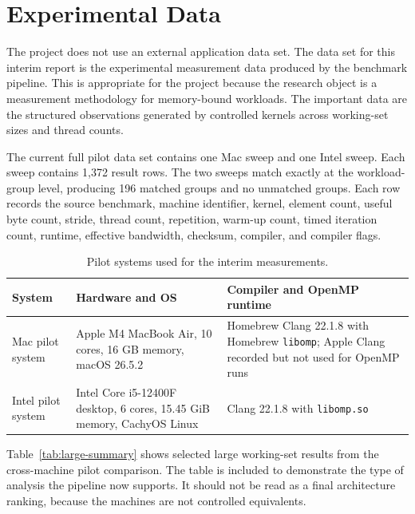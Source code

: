 \documentclass[11pt]{article}
\begin{document}
\section{Experimental Data}

The project does not use an external application data set. The data set for this interim report is the experimental measurement data produced by the benchmark pipeline. This is appropriate for the project because the research object is a measurement methodology for memory-bound workloads. The important data are the structured observations generated by controlled kernels across working-set sizes and thread counts.

The current full pilot data set contains one Mac sweep and one Intel sweep. Each sweep contains 1,372 result rows. The two sweeps match exactly at the workload-group level, producing 196 matched groups and no unmatched groups. Each row records the source benchmark, machine identifier, kernel, element count, useful byte count, stride, thread count, repetition, warm-up count, timed iteration count, runtime, effective bandwidth, checksum, compiler, and compiler flags.

\begin{table}[htbp]
\caption{Pilot systems used for the interim measurements.}
\label{tab:systems}
\centering
\small
\begin{tabular}{p{1.35in}p{2.05in}p{2.25in}}
\toprule
System & Hardware and OS & Compiler and OpenMP runtime \\
\midrule
Mac pilot system & Apple M4 MacBook Air, 10 cores, 16 GB memory, macOS 26.5.2 & Homebrew Clang 22.1.8 with Homebrew \texttt{libomp}; Apple Clang recorded but not used for OpenMP runs \\
Intel pilot system & Intel Core i5-12400F desktop, 6 cores, 15.45 GiB memory, CachyOS Linux & Clang 22.1.8 with \texttt{libomp.so} \\
\bottomrule
\end{tabular}
\end{table}

Table~\ref{tab:large-summary} shows selected large working-set results from the cross-machine pilot comparison. The table is included to demonstrate the type of analysis the pipeline now supports. It should not be read as a final architecture ranking, because the machines are not controlled equivalents.
\end{document}
